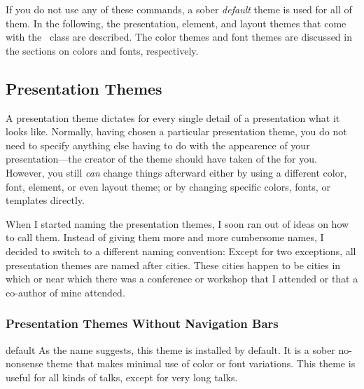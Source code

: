 
If you do not use any of these commands, a sober \emph{default} theme
is used for all of them. In the following, the presentation, element,
and layout themes that come with the \beamer\ class are described. The
color themes and font themes are discussed in the sections on colors
and fonts, respectively.


\subsection{Presentation Themes}

A presentation theme dictates for every single detail
of a presentation what it looks like. Normally, having chosen a
particular presentation theme, you do not need to specify anything
else having to do with the appearence of your presentation---the
creator of the theme should have taken of the for you. However, you
still \emph{can} change things afterward either by using a different
color, font, element, or even layout theme; or by changing specific
colors, fonts, or templates directly.

When I started naming the presentation themes, I soon ran out of ideas
on how to call them. Instead of giving them more and more cumbersome
names, I decided to switch to a different naming convention:
Except for two exceptions, all presentation themes are named after
cities. These cities happen to be cities in which or near which there
was a conference or workshop that I attended or that a
co-author of mine attended. 


\subsubsection{Presentation Themes Without Navigation Bars}

\begin{themeexample}{default}
As the name suggests, this theme is installed by default. It is a
sober no-nonsense theme that makes minimal use of color or font
variations. This theme is useful for all kinds of talks, except for
very long talks.
\end{themeexample}


